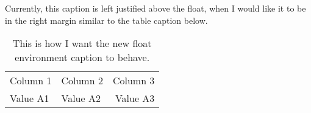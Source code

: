 \documentclass{tufte-book}
\begin{document}
\begin{example}
\caption{Currently, this caption is left justified above the float, when I would like it to be in the right margin similar to the table caption below.}
\begin{shaded}
\lipsum[2]
\end{shaded}
\end{example}

\begin{table}
\caption{This is how I want the new float environment caption to behave.}
\centering
\begin{tabular}{llr}
Column 1 & Column 2 & Column 3 \\
Value A1 & Value A2 & Value A3 \\
\end{tabular}
\end{table}
\end{document}
